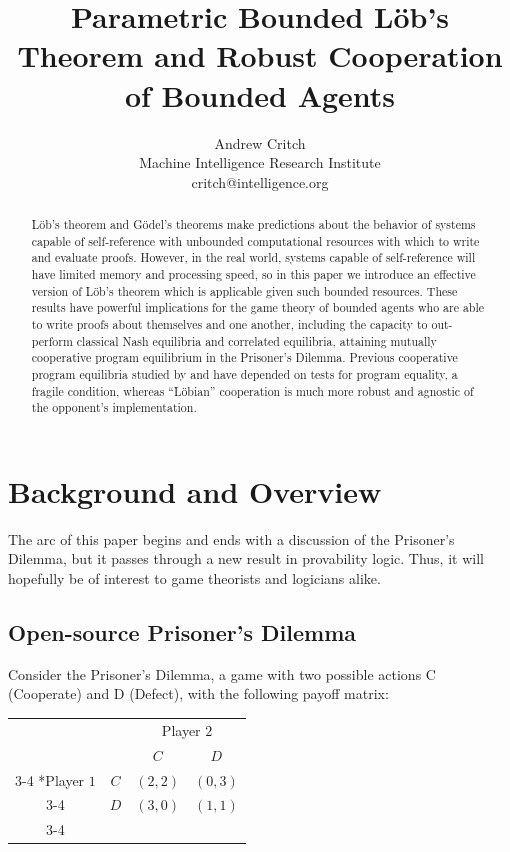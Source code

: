 \documentclass[onecolumn,authordate]{miri-tech-article}
\title{Parametric Bounded L\"{o}b's Theorem and Robust Cooperation of Bounded Agents}
\author{Andrew Critch \\ Machine Intelligence Research Institute \\ critch@intelligence.org}
\numberwithin{equation}{section}
\theoremstyle{definition}
\renewcommand{\-}{^{-1}}
\begin{document}

\maketitle

\begin{abstract}
L\"{o}b's theorem and G\"{o}del's theorems make predictions about the behavior of systems capable of self-reference with unbounded computational resources with which to write and evaluate proofs.  However, in the real world, systems capable of self-reference will have limited memory and processing speed, so in this paper we introduce an effective version of L\"{o}b's theorem which is applicable given such bounded resources.  
These results have powerful implications for the game theory of bounded agents who are able to write proofs about themselves and one another, including the capacity to out-perform classical Nash equilibria and correlated equilibria, attaining mutually cooperative program equilibrium in the Prisoner's Dilemma.  Previous cooperative program equilibria studied by \citet{Tennenholtz:2004:Program} and \citet{Fortnow:2009:Program} have depended on tests for program equality, a fragile condition, whereas ``L\"{o}bian'' cooperation is much more robust and agnostic of the opponent's implementation.
\end{abstract}

\section{Background and Overview}\label{sec:bo}

The arc of this paper begins and ends with a discussion of the Prisoner's Dilemma, but it passes through a new result in provability logic.  Thus, it will hopefully be of interest to game theorists and logicians alike.

\subsection{Open-source Prisoner's Dilemma}

Consider the Prisoner's Dilemma, a game with two possible actions C (Cooperate) and D (Defect), with the following payoff matrix:

  \begin{table}[ht]
  \centering
    \setlength{\extrarowheight}{2pt}
    \begin{tabular}{cc|c|c|}
      & \multicolumn{1}{c}{} & \multicolumn{2}{c}{Player $2$}\\
      & \multicolumn{1}{c}{} & \multicolumn{1}{c}{$C$}  & \multicolumn{1}{c}{$D$} \\\cline{3-4}
      \multirow{2}*{Player $1$}  & $C$ & $(2,2)$ & $(0,3)$ \\\cline{3-4}
      & $D$ & $(3,0)$ & $(1,1)$ \\\cline{3-4}
    \end{tabular}
  \end{table}
\end{document}

